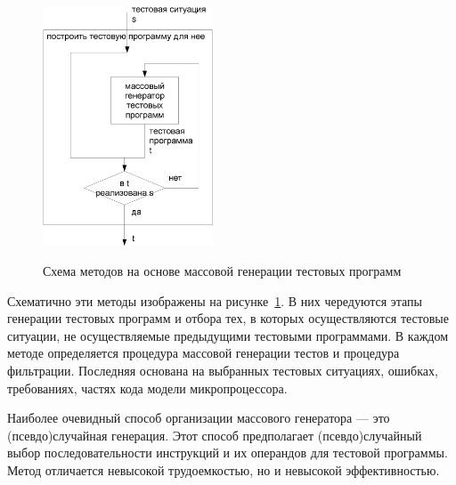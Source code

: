 \begin{figure}[h] \center
  \includegraphics[width=0.45\textwidth]{1.review/methods1}\\
  \caption{Схема методов на основе массовой генерации тестовых программ}\label{fig:massive_methods}
\end{figure}

Схематично эти методы изображены на рисунке~\ref{fig:massive_methods}. В них чередуются этапы генерации тестовых программ и отбора тех, в которых осуществляются тестовые ситуации, не осуществляемые предыдущими тестовыми программами. В каждом методе определяется процедура массовой генерации тестов и процедура фильтрации. Последняя основана на выбранных тестовых ситуациях, ошибках, требованиях, частях кода модели микропроцессора.

Наиболее очевидный способ организации массового генератора --- это (псевдо)случайная генерация. Этот способ предполагает (псевдо)случайный выбор последовательности инструкций и их операндов для тестовой программы. Метод отличается невысокой трудоемкостью, но и невысокой эффективностью.


